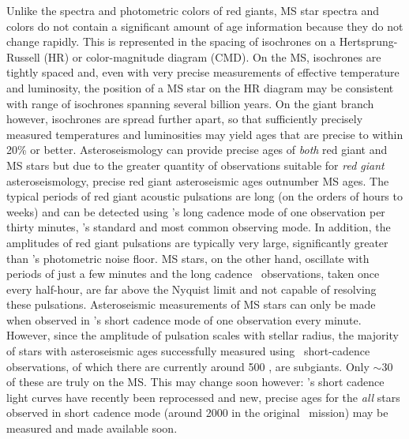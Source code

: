 Unlike the spectra and photometric colors of red giants, MS star spectra and
colors do not contain a significant amount of age information because they do
not change rapidly.
This is represented in the spacing of isochrones on a Hertsprung-Russell (HR)
or color-magnitude diagram (CMD).
On the MS, isochrones are tightly spaced and, even with very precise
measurements of effective temperature and luminosity, the position of a MS
star on the HR diagram may be consistent with range of isochrones spanning
several billion years.
On the giant branch however, isochrones are spread further apart, so that
sufficiently precisely measured temperatures and luminosities may yield ages
that are precise to within 20\% or better.
 Asteroseismology
can provide precise ages of {\it both} red giant and MS stars but due to the
greater quantity of observations suitable for {\it red giant}
asteroseismology, precise red giant asteroseismic ages outnumber MS ages.
The typical periods of red giant acoustic pulsations are long (on the orders
of hours to weeks) and can be detected using \kepler's long cadence mode of
one observation per thirty minutes, \kepler's standard and most common
observing mode.
In addition, the amplitudes of red giant pulsations are typically very large,
significantly greater than \kepler's photometric noise floor.
MS stars, on the other hand, oscillate with periods of just a few minutes and
the long cadence \kepler\ observations, taken once every half-hour, are
far above the Nyquist limit and not capable of resolving these pulsations.
Asteroseismic measurements of MS stars can only be made when observed in
\kepler's short cadence mode of one observation every minute.
However, since the amplitude of pulsation scales with stellar radius, the
majority of stars with asteroseismic ages successfully measured using \kepler\
short-cadence observations, of which there are currently around 500
\citep{chaplin2014}, are subgiants.
Only $\sim$30 of these are truly on the MS.
This may change soon however: \kepler's short cadence
light curves have recently been reprocessed and new, precise ages for the {\it
all} stars observed in short cadence mode (around 2000 in the original
\kepler\ mission) may be measured and made available soon.

